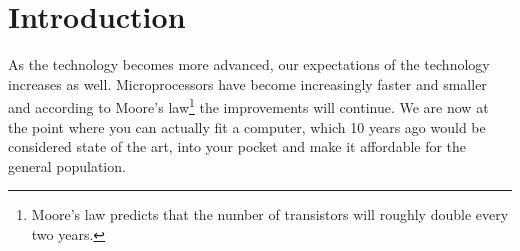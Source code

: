 \chapter{Introduction}
As the technology becomes more advanced, our expectations of the technology increases as well. Microprocessors have become increasingly faster and smaller and according to Moore's law\footnote{Moore's law predicts that the number of transistors will roughly double every two years.} the improvements will continue. We are now at the point where you can actually fit a computer, which 10 years ago would be considered state of the art, into your pocket and make it affordable for the general population.

